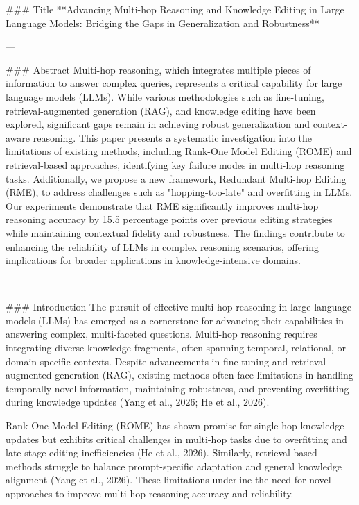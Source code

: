 ### Title  
**Advancing Multi-hop Reasoning and Knowledge Editing in Large Language Models: Bridging the Gaps in Generalization and Robustness**

---

### Abstract  
Multi-hop reasoning, which integrates multiple pieces of information to answer complex queries, represents a critical capability for large language models (LLMs). While various methodologies such as fine-tuning, retrieval-augmented generation (RAG), and knowledge editing have been explored, significant gaps remain in achieving robust generalization and context-aware reasoning. This paper presents a systematic investigation into the limitations of existing methods, including Rank-One Model Editing (ROME) and retrieval-based approaches, identifying key failure modes in multi-hop reasoning tasks. Additionally, we propose a new framework, Redundant Multi-hop Editing (RME), to address challenges such as "hopping-too-late" and overfitting in LLMs. Our experiments demonstrate that RME significantly improves multi-hop reasoning accuracy by 15.5 percentage points over previous editing strategies while maintaining contextual fidelity and robustness. The findings contribute to enhancing the reliability of LLMs in complex reasoning scenarios, offering implications for broader applications in knowledge-intensive domains.

---

### Introduction  
The pursuit of effective multi-hop reasoning in large language models (LLMs) has emerged as a cornerstone for advancing their capabilities in answering complex, multi-faceted questions. Multi-hop reasoning requires integrating diverse knowledge fragments, often spanning temporal, relational, or domain-specific contexts. Despite advancements in fine-tuning and retrieval-augmented generation (RAG), existing methods often face limitations in handling temporally novel information, maintaining robustness, and preventing overfitting during knowledge updates (Yang et al., 2026; He et al., 2026). 

Rank-One Model Editing (ROME) has shown promise for single-hop knowledge updates but exhibits critical challenges in multi-hop tasks due to overfitting and late-stage editing inefficiencies (He et al., 2026). Similarly, retrieval-based methods struggle to balance prompt-specific adaptation and general knowledge alignment (Yang et al., 2026). These limitations underline the need for novel approaches to improve multi-hop reasoning accuracy and reliability.

